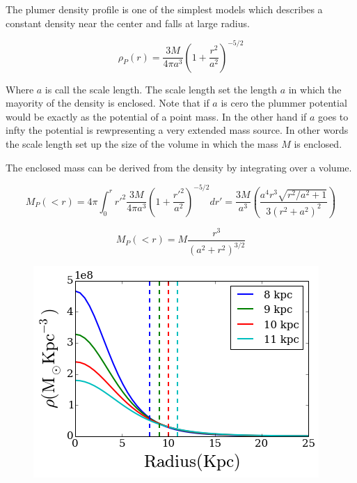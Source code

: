 \documentclass[a4paper, 12pt]{article} %
\begin{document}
The plumer density profile is one of the simplest models which describes
a constant density near the center and falls at large radius.

\begin{equation}
\rho_P (r) = \frac{3M}{4\pi a^3} (1 + \frac{r^2}{a^2})^{-5/2}
\end{equation}

Where $a$ is call the scale length. The scale length set the length $a$ in which the mayority of the density is enclosed. Note
that if $a$ is cero the plummer potential would be exactly as the potential of a point mass.
In the other hand if $a$ goes to infty the potential is rewpresenting a very extended mass source.
In other words the scale length set up the size of the volume in which the mass $M$ is enclosed.

The enclosed mass can be derived from the density by integrating over a volume.

\begin{equation}
M_P(<r) = 4 \pi \int_0^r r'^2\frac{3M}{4\pi a^3} (1 + \frac{r'^2}{a^2})^{-5/2} dr' = \frac{3M}{a^3} \left( \frac{a^4 r^3 \sqrt{r^2/a^2 + 1}}{3(r^2 + a^2)^2}  \right)
\end{equation}

\begin{equation}
M_P(<r) = M \frac{r^3}{(a^2+r^2)^{3/2}}
\end{equation}

\begin{figure}[H]
\centering
\includegraphics[scale=0.7]{plummer_density.png}
\end{figure}
\end{document}
